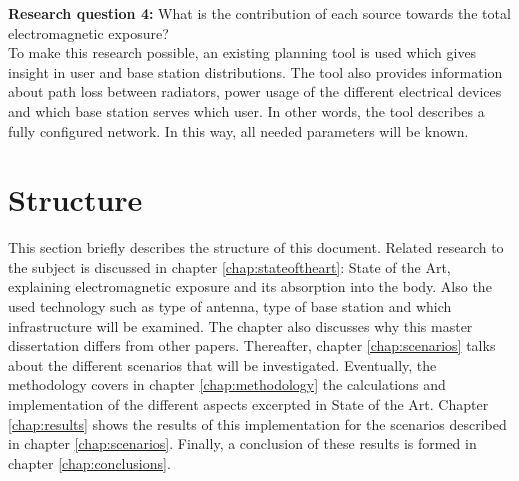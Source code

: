 \textbf{Research question 4:} What is the contribution of each source towards the total electromagnetic exposure?\\

To make this research possible, an existing planning tool is used which gives insight in user and base station distributions.
The tool also provides information about path loss between radiators, power usage of the different electrical devices and which base station serves which user. In other words, the tool describes 
a fully configured network.
In this way, all needed parameters will be known.

\section{Structure}
\label{sec:structure}
This section briefly describes the structure of this document. Related research to the subject is discussed in chapter \ref{chap:stateoftheart}: State of the Art, explaining
electromagnetic exposure and its absorption into the body. Also the used technology such as type of antenna, type of base station and 
which infrastructure will be examined. The chapter also discusses why this master dissertation differs from other papers.
Thereafter, chapter \ref{chap:scenarios} talks about the different scenarios that will be investigated. 
Eventually, the methodology covers in chapter \ref{chap:methodology} the calculations and implementation of the different aspects excerpted in State of the Art.
Chapter \ref{chap:results} shows the results of this 
implementation for the scenarios described in chapter \ref{chap:scenarios}. 
Finally, a conclusion of these results is formed in chapter \ref{chap:conclusions}.